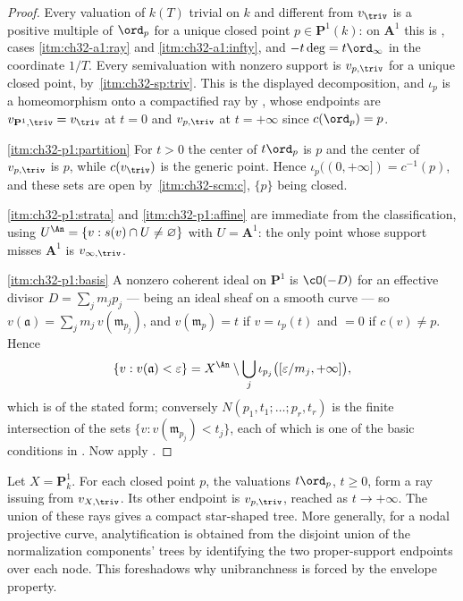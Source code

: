 \begin{proof}
Every valuation of $k(T)$ trivial on $k$ and different from
$v_\triv$ is a positive multiple of $\ord_p$ for a unique closed point
$p\in\mathbf P^1(k)$: on $\mathbf A^1$ this is
, cases \cref{itm:ch32-a1:ray} and
\cref{itm:ch32-a1:infty}, and $-t\deg=t\ord_\infty$ in the coordinate
$1/T$.  Every semivaluation with nonzero support is $v_{p,\triv}$ for a
unique closed point, by
\,\cref{itm:ch32-sp:triv}.  This is the
displayed decomposition, and $\iota_p$ is a homeomorphism onto a
compactified ray by , whose endpoints are
$v_{\mathbf P^1,\triv}=v_\triv$ at $t=0$ and $v_{p,\triv}$ at
$t=+\infty$ since $c(\ord_p)=p$.

\cref{itm:ch32-p1:partition}  For $t>0$ the center of $t\ord_p$ is $p$
and the center of $v_{p,\triv}$ is $p$, while $c(v_\triv)$ is the
generic point.  Hence $\iota_p((0,+\infty])=c^{-1}(p)$, and these sets are
open by \,\cref{itm:ch32-scm:c}, $\{p\}$
being closed.

\cref{itm:ch32-p1:strata} and \cref{itm:ch32-p1:affine} are immediate from the
classification, using $U^{\An}=\{v:s(v)\cap U\neq\varnothing\}$ with
$U=\mathbf A^1$: the only point whose support misses $\mathbf A^1$ is
$v_{\infty,\triv}$.

\cref{itm:ch32-p1:basis}  A nonzero coherent ideal on $\mathbf P^1$ is
$\cO(-D)$ for an effective divisor $D=\sum_jm_jp_j$ --- being an ideal
sheaf on a smooth curve --- so
$v(\mathfrak a)=\sum_j m_j\,v(\mathfrak m_{p_j})$, and
$v(\mathfrak m_{p})=t$ if $v=\iota_{p}(t)$ and $=0$ if
$c(v)\neq p$.  Hence
\[
 \{v:v(\mathfrak a)<\varepsilon\}
 =X^{\An}\setminus\bigcup_j\iota_{p_j}\bigl([\varepsilon/m_j,+\infty]\bigr),
\]
which is of the stated form; conversely
$N(p_1,t_1;\ldots;p_r,t_r)$ is the finite intersection of the sets
$\{v:v(\mathfrak m_{p_j})<t_j\}$, each of which is one of the basic
conditions in .  Now apply
.
\end{proof}

\begin{example}
\label{ex:triv-p1-tree}
Let $X=\mathbf P^1_k$.  For each closed point $p$, the valuations
$t\ord_p$, $t\geq0$, form a ray issuing from $v_{X,\triv}$.  Its other
endpoint is $v_{p,\triv}$, reached as $t\to+\infty$.  The union of these
rays gives a compact star-shaped tree.  More generally, for a nodal
projective curve, analytification is obtained from the disjoint union of
the normalization components' trees by identifying
the two proper-support endpoints over each node.  This foreshadows why
unibranchness is forced by the envelope property.
\end{example}

